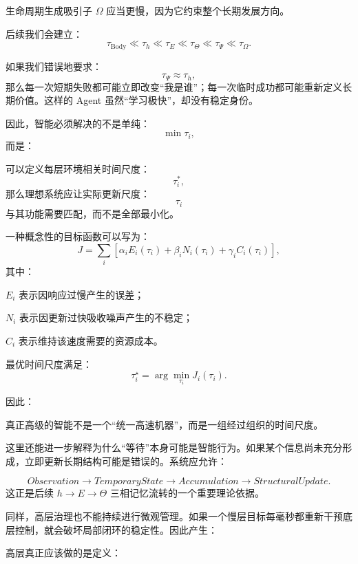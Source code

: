 生命周期生成吸引子 $\Omega$ 应当更慢，因为它约束整个长期发展方向。

后续我们会建立：
\[
\boxed{
\tau_{\mathrm{Body}}
\ll
\tau_h
\ll
\tau_E
\ll
\tau_\Theta
\ll
\tau_\Psi
\ll
\tau_\Omega.
}
\]

如果我们错误地要求：
\[
\tau_\Psi
\approx
\tau_h,
\]
那么每一次短期失败都可能立即改变“我是谁”；每一次临时成功都可能重新定义长期价值。这样的 Agent 虽然“学习极快”，却没有稳定身份。

因此，智能必须解决的不是单纯：
\[
\min \tau_i,
\]
而是：
\begin{statementbox}
\centering
{}
\end{statementbox}

可以定义每层环境相关时间尺度：
\[
\tau_i^\ast,
\]
那么理想系统应让实际更新尺度：
\[
\tau_i
\]
与其功能需要匹配，而不是全部最小化。

一种概念性的目标函数可以写为：
\[
J
=
\sum_i
\left[
\alpha_i
E_i(\tau_i)
+
\beta_i
N_i(\tau_i)
+
\gamma_i
C_i(\tau_i)
\right],
\]
其中：

$E_i$ 表示因响应过慢产生的误差；

$N_i$ 表示因更新过快吸收噪声产生的不稳定；

$C_i$ 表示维持该速度需要的资源成本。

最优时间尺度满足：
\[
\tau_i^\star
=
\arg\min_{\tau_i}J_i(\tau_i).
\]

因此：

\begin{statementbox}
\centering
{}
\end{statementbox}

真正高级的智能不是一个“统一高速机器”，而是一组经过组织的时间尺度。

这里还能进一步解释为什么“等待”本身可能是智能行为。如果某个信息尚未充分形成，立即更新长期结构可能是错误的。系统应允许：

\[
Observation
\rightarrow
TemporaryState
\rightarrow
Accumulation
\rightarrow
StructuralUpdate.
\]
这正是后续 $h\rightarrow E\rightarrow\Theta$ 三相记忆流转的一个重要理论依据。

同样，高层治理也不能持续进行微观管理。如果一个慢层目标每毫秒都重新干预底层控制，就会破坏局部闭环的稳定性。因此产生：

\begin{statementbox}
\centering
{}
\end{statementbox}
高层真正应该做的是定义：

